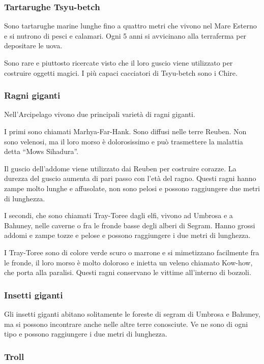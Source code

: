 \subsubsection{Tartarughe Tsyu-betch} 

Sono tartarughe marine lunghe fino a quattro metri che vivono nel Mare
Esterno e si nutrono di pesci e calamari. Ogni 5 anni si avvicinano
alla terraferma per depositare le uova.

Sono rare e piuttosto ricercate visto che il loro guscio viene
utilizzato per costruire oggetti magici. I pi\`u capaci cacciatori
di Tsyu-betch sono i Chire.

\subsubsection{Ragni giganti}

Nell'Arcipelago vivono due principali variet\`a di ragni giganti.

I primi sono chiamati Marhya-Far-Hank. Sono diffusi nelle terre
Reuben. Non sono velenosi, ma il loro morso \`e dolorosissimo e
pu\`o trasmettere la malattia detta ``Mows Sihadura''.

Il guscio dell'addome viene utilizzato dai Reuben per costruire
corazze.  La durezza del guscio aumenta di pari passo con l'et\`a
del ragno. Questi ragni hanno zampe molto lunghe e affusolate, non
sono pelosi e possono raggiungere due metri di lunghezza.

I secondi, che sono chiamati Tray-Toree dagli elfi, vivono ad Umbrosa
e a Bahuney, nelle caverne o fra le fronde basse degli alberi di
Segram. Hanno grossi addomi e zampe tozze e pelose e possono
raggiungere i due metri di lunghezza.

I Tray-Toree sono di colore verde scuro o marrone e si mimetizzano
facilmente fra le fronde, il loro morso \`e molto doloroso e inietta
un veleno chiamato Kow-how, che porta alla paralisi. Questi ragni
conservano le vittime all'interno di bozzoli.

\subsubsection{Insetti giganti} 

Gli insetti giganti abitano solitamente le foreste di segram di
Umbrosa e Bahuney, ma si possono incontrare anche nelle altre terre
conosciute. Ve ne sono di ogni tipo e possono raggiungere i due metri
di lunghezza.

\subsubsection{Troll} 

